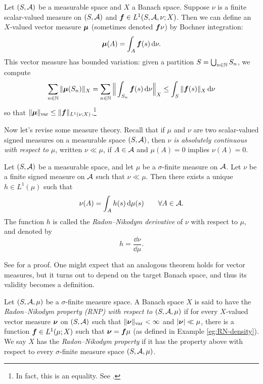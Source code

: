 \begin{example}\label{eg:RN-density}
  Let $(S,\mathcal{A})$ be a measurable space and $X$ a Banach space.
  Suppose $\nu$ is a finite scalar-valued measure on $(S,\mathcal{A})$ and $\bm{f} \in L^1(S,\mathcal{A},\nu;X)$.
  Then we can define an $X$-valued vector measure $\bm{\mu}$ (sometimes denoted $\bm{f}\nu$) by Bochner integration:
  \begin{equation*}
    \bm{\mu}(A) = \int_A \bm{f}(s) \, \mathrm{d}\nu.
  \end{equation*}
  This vector measure has bounded variation: given a partition $S = \bigcup_{n \in \mathbb{N}} S_n$, we compute
  \begin{equation*}
    \sum_{n \in \mathbb{N}} \|\bm{\mu}(S_n)\|_{X} = \sum_{n \in \mathbb{N}} \Big\| \int_{S_n} \bm{f}(s) \, \mathrm{d}\nu \Big\|_X
    \leq \int_{S} \|\bm{f}(s)\|_{X} \, \mathrm{d}\nu
  \end{equation*}
  so that $\|\bm{\mu}\|_{\mathrm{var}} \leq \|\bm{f}\|_{L^1(\nu;X)}$.\footnote{In fact, this is an equality. See \cite[pp43]{gP16}.}
\end{example}

Now let's revise some measure theory.
Recall that if $\mu$ and $\nu$ are two scalar-valued signed measures on a measurable space $(S,\mathcal{A})$, then \emph{$\nu$ is absolutely continuous with respect to $\mu$}, written $\nu \ll \mu$, if $A \in \mathcal{A}$ and $\mu(A) = 0$ implies $\nu(A) = 0$.

\begin{thm}
  Let $(S,\mathcal{A})$ be a measurable space, and let $\mu$ be a $\sigma$-finite measure on $\mathcal{A}$.
  Let $\nu$ be a finite signed measure on $\mathcal{A}$ such that $\nu \ll \mu$.
  Then there exists a unique $h \in L^1(\mu)$ such that
  \begin{equation*}
    \nu(A) = \int_{A} h(s) \, \mathrm{d}\mu(s) \qquad \forall A \in \mathcal{A}.
  \end{equation*}
  The function $h$ is called the \emph{Radon--Nikodym derivative} of $\nu$ with respect to $\mu$, and denoted by
  \begin{equation*}
    h = \frac{\dd\nu}{\dd\mu}.
  \end{equation*}
\end{thm}

See \cite[Theorem 5.5.4]{rD04} for a proof.
One might expect that an analogous theorem holds for vector measures, but it turns out to depend on the target Banach space, and thus its validity becomes a definition.

\begin{defn}
  Let $(S,\mathcal{A},\mu)$ be a $\sigma$-finite measure space.
  A Banach space $X$ is said to have the \emph{Radon--Nikodym property (RNP) with respect to $(S,\mathcal{A},\mu)$} if for every $X$-valued vector measure $\bm{\nu}$ on $(S,\mathcal{A})$ such that $\|\bm{\nu}\|_{\mathrm{var}} < \infty$ and $|\bm{\nu}| \ll \mu$, there is a function $\bm{f} \in L^1(\mu;X)$ such that $\bm{\nu} = \bm{f}\mu$ (as defined in Example \ref{eg:RN-density}).
  We say $X$ has the \emph{Radon--Nikodym property} if it has the property above with respect to every $\sigma$-finite measure space $(S,\mathcal{A},\mu)$.
\end{defn}

